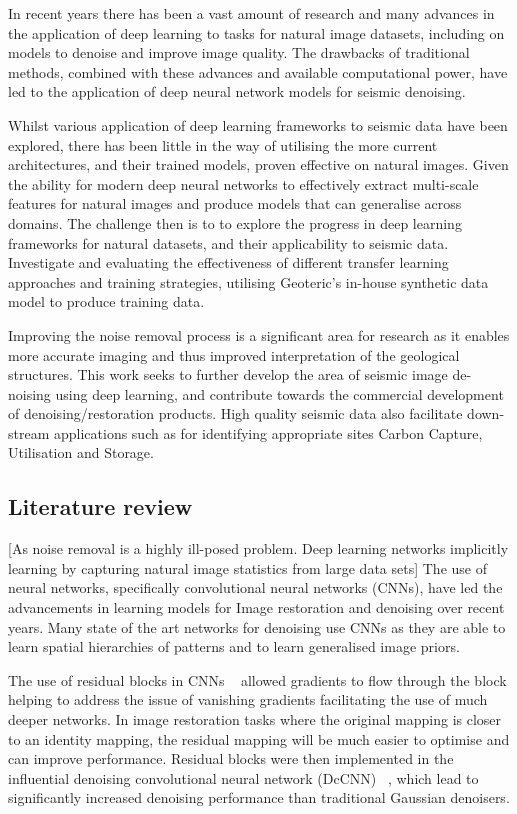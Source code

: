 \documentclass[project-plan]{report-template}
\begin{document}
In recent years there has been a vast amount of research and many advances in the application of deep learning to tasks for natural image datasets, including on models to denoise and improve image quality. The drawbacks of traditional methods, combined with these advances and available computational power, have led to the application of deep neural network models for seismic denoising. 

Whilst various application of deep learning frameworks to seismic data have been explored, there has been little in the way of utilising the more current architectures, and their trained models, proven effective on natural images. Given the ability for modern deep neural networks to effectively extract multi-scale  features for natural images and produce models that can generalise across domains. The challenge then is to to explore the progress in deep learning frameworks for natural datasets, and their applicability to seismic data.  Investigate and evaluating the effectiveness of different transfer learning approaches and training strategies, utilising Geoteric's in-house synthetic data model to produce training data.

Improving the noise removal process is a significant area for research as it enables more accurate imaging and thus improved interpretation of the geological structures. This work seeks to further develop the area of seismic image de-noising using deep learning, and contribute towards the commercial development of denoising/restoration products. High quality seismic data also facilitate down-stream applications such as for identifying appropriate sites Carbon Capture, Utilisation and Storage.

\subsection{Literature review}
[As noise removal is a highly ill-posed problem. Deep learning networks implicitly learning by capturing natural image statistics from large data sets]
The use of neural networks, specifically convolutional neural networks (CNNs), have led the advancements in learning models for Image restoration and denoising over recent years. Many state of the art networks for denoising use CNNs as they are able to learn spatial hierarchies of patterns and to learn generalised image priors.

The use of residual blocks in CNNs ~\cite{he2015DeepRL} allowed gradients to flow through the block helping to address the issue of vanishing gradients facilitating the use of much deeper networks. In image restoration tasks where the original mapping is closer to an identity mapping, the residual mapping will be much easier to optimise and can improve performance. Residual blocks were then implemented in the influential denoising convolutional neural network (DcCNN) ~\cite{zhang2017beyond}, which lead to significantly increased denoising performance than traditional Gaussian denoisers. 
\end{document}
